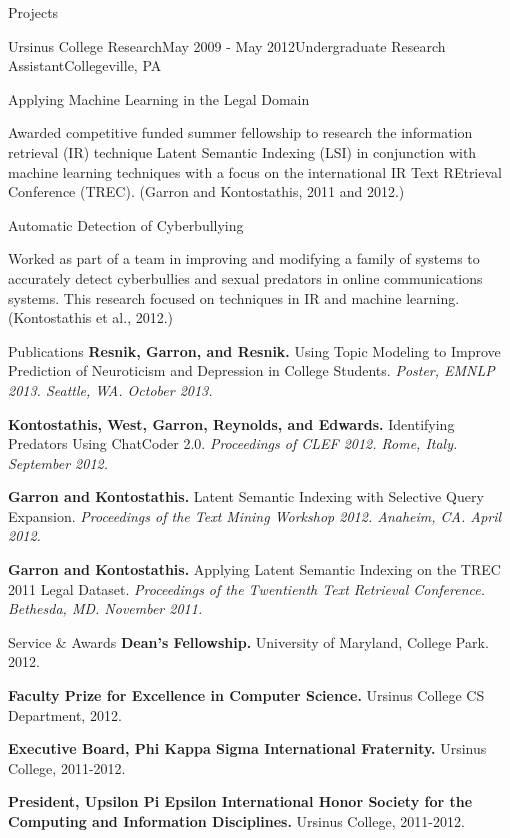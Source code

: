 \documentclass{resume} %
\begin{document}
\begin{rSection}{Projects}
\begin{rSubsection}{Ursinus College Research}{May 2009 - May 2012}{Undergraduate Research Assistant}{Collegeville, PA}
\item
\begin{rWorkProject}{Applying Machine Learning in the Legal Domain}
\item Awarded competitive funded summer fellowship to research the information retrieval (IR) technique Latent Semantic Indexing (LSI) in conjunction with machine learning techniques with a focus on the international IR Text REtrieval Conference (TREC). (Garron and Kontostathis, 2011 and 2012.)
\end{rWorkProject}
\item
\begin{rWorkProject}{Automatic Detection of Cyberbullying}
\item Worked as part of a team in improving and modifying a family of systems to accurately detect cyberbullies and sexual predators in online communications systems. This research focused on techniques in IR and
machine learning. (Kontostathis et al., 2012.)
\end{rWorkProject}
\end{rSubsection}
\end{rSection}


\begin{rSection}{Publications}
\textbf{Resnik, Garron, and Resnik.} Using Topic Modeling to Improve Prediction of Neuroticism and Depression in College Students. \textit{Poster, EMNLP 2013. Seattle, WA. October 2013.}
\item \textbf{Kontostathis, West, Garron, Reynolds, and Edwards.} Identifying Predators Using ChatCoder 2.0. \textit{Proceedings of CLEF 2012. Rome, Italy. September 2012.}
\item \textbf{Garron and Kontostathis.} Latent Semantic Indexing with Selective Query Expansion. \textit{Proceedings of the Text Mining Workshop 2012. Anaheim, CA. April 2012.}
\item \textbf{Garron and Kontostathis.} Applying Latent Semantic Indexing on the TREC 2011 Legal Dataset. \textit{Proceedings of the Twentienth Text Retrieval Conference. Bethesda, MD. November 2011.}
\end{rSection}

\begin{rSection}{Service \& Awards}
\textbf{Dean's Fellowship.} University of Maryland, College Park. 2012.
\item \textbf{Faculty Prize for Excellence in Computer Science.} Ursinus College CS Department, 2012.
\item \textbf{Executive Board, Phi Kappa Sigma International Fraternity.} Ursinus College, 2011-2012.
\item \textbf{President, Upsilon Pi Epsilon International Honor Society for the Computing and Information Disciplines.} Ursinus College, 2011-2012.
\end{rSection}
\end{document}
